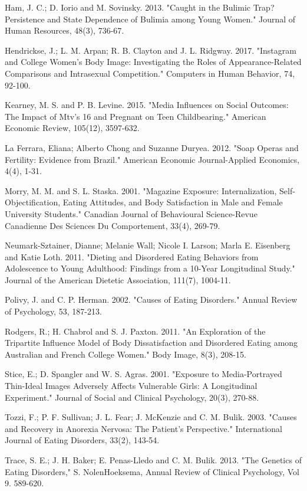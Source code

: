 \documentclass[12pt]{article}
\begin{document}
\begin{thebibliography}{9}
\item 
Ham, J. C.; D. Iorio and M. Sovinsky. 2013. "Caught in the Bulimic Trap? Persistence and State Dependence of Bulimia among Young Women." Journal of Human Resources, 48(3), 736-67.

\item 
Hendrickse, J.; L. M. Arpan; R. B. Clayton and J. L. Ridgway. 2017. "Instagram and College Women's Body Image: Investigating the Roles of Appearance-Related Comparisons and Intrasexual Competition." Computers in Human Behavior, 74, 92-100.

\item 
Kearney, M. S. and P. B. Levine. 2015. "Media Influences on Social Outcomes: The Impact of Mtv's 16 and Pregnant on Teen Childbearing." American Economic Review, 105(12), 3597-632.

\item 
La Ferrara, Eliana; Alberto Chong and Suzanne Duryea. 2012. "Soap Operas and Fertility: Evidence from Brazil." American Economic Journal-Applied Economics, 4(4), 1-31.

\item 
Morry, M. M. and S. L. Staska. 2001. "Magazine Exposure: Internalization, Self-Objectification, Eating Attitudes, and Body Satisfaction in Male and Female University Students." Canadian Journal of Behavioural Science-Revue Canadienne Des Sciences Du Comportement, 33(4), 269-79.

\item 
Neumark-Sztainer, Dianne; Melanie Wall; Nicole I. Larson; Marla E. Eisenberg and Katie Loth. 2011. "Dieting and Disordered Eating Behaviors from Adolescence to Young Adulthood: Findings from a 10-Year Longitudinal Study." Journal of the American Dietetic Association, 111(7), 1004-11.

\item 
Polivy, J. and C. P. Herman. 2002. "Causes of Eating Disorders." Annual Review of Psychology, 53, 187-213.

\item
Rodgers, R.; H. Chabrol and S. J. Paxton. 2011. "An Exploration of the Tripartite Influence Model of Body Dissatisfaction and Disordered Eating among Australian and French College Women." Body Image, 8(3), 208-15.

\item 
Stice, E.; D. Spangler and W. S. Agras. 2001. "Exposure to Media-Portrayed Thin-Ideal Images Adversely Affects Vulnerable Girls: A Longitudinal Experiment." Journal of Social and Clinical Psychology, 20(3), 270-88.

\item 
Tozzi, F.; P. F. Sullivan; J. L. Fear; J. McKenzie and C. M. Bulik. 2003. "Causes and Recovery in Anorexia Nervosa: The Patient's Perspective." International Journal of Eating Disorders, 33(2), 143-54.

\item 
Trace, S. E.; J. H. Baker; E. Penas-Lledo and C. M. Bulik. 2013. "The Genetics of Eating Disorders," S. NolenHoeksema, Annual Review of Clinical Psychology, Vol 9. 589-620.
	
\end{thebibliography}
\end{document}
